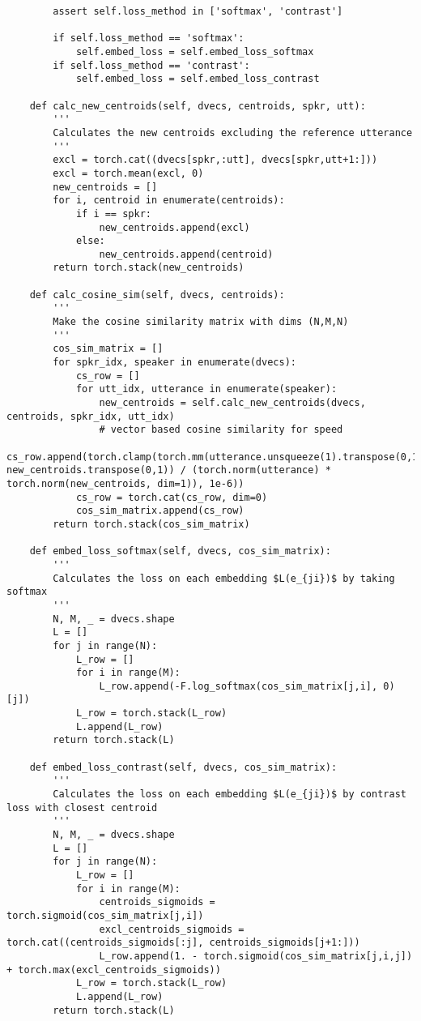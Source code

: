 \begin{verbatim}
        assert self.loss_method in ['softmax', 'contrast']

        if self.loss_method == 'softmax':
            self.embed_loss = self.embed_loss_softmax
        if self.loss_method == 'contrast':
            self.embed_loss = self.embed_loss_contrast

    def calc_new_centroids(self, dvecs, centroids, spkr, utt):
        '''
        Calculates the new centroids excluding the reference utterance
        '''
        excl = torch.cat((dvecs[spkr,:utt], dvecs[spkr,utt+1:]))
        excl = torch.mean(excl, 0)
        new_centroids = []
        for i, centroid in enumerate(centroids):
            if i == spkr:
                new_centroids.append(excl)
            else:
                new_centroids.append(centroid)
        return torch.stack(new_centroids)

    def calc_cosine_sim(self, dvecs, centroids):
        '''
        Make the cosine similarity matrix with dims (N,M,N)
        '''
        cos_sim_matrix = []
        for spkr_idx, speaker in enumerate(dvecs):
            cs_row = []
            for utt_idx, utterance in enumerate(speaker):
                new_centroids = self.calc_new_centroids(dvecs, centroids, spkr_idx, utt_idx)
                # vector based cosine similarity for speed
                cs_row.append(torch.clamp(torch.mm(utterance.unsqueeze(1).transpose(0,1), new_centroids.transpose(0,1)) / (torch.norm(utterance) * torch.norm(new_centroids, dim=1)), 1e-6))
            cs_row = torch.cat(cs_row, dim=0)
            cos_sim_matrix.append(cs_row)
        return torch.stack(cos_sim_matrix)

    def embed_loss_softmax(self, dvecs, cos_sim_matrix):
        '''
        Calculates the loss on each embedding $L(e_{ji})$ by taking softmax
        '''
        N, M, _ = dvecs.shape
        L = []
        for j in range(N):
            L_row = []
            for i in range(M):
                L_row.append(-F.log_softmax(cos_sim_matrix[j,i], 0)[j])
            L_row = torch.stack(L_row)
            L.append(L_row)
        return torch.stack(L)

    def embed_loss_contrast(self, dvecs, cos_sim_matrix):
        ''' 
        Calculates the loss on each embedding $L(e_{ji})$ by contrast loss with closest centroid
        '''
        N, M, _ = dvecs.shape
        L = []
        for j in range(N):
            L_row = []
            for i in range(M):
                centroids_sigmoids = torch.sigmoid(cos_sim_matrix[j,i])
                excl_centroids_sigmoids = torch.cat((centroids_sigmoids[:j], centroids_sigmoids[j+1:]))
                L_row.append(1. - torch.sigmoid(cos_sim_matrix[j,i,j]) + torch.max(excl_centroids_sigmoids))
            L_row = torch.stack(L_row)
            L.append(L_row)
        return torch.stack(L)


\end{verbatim}
